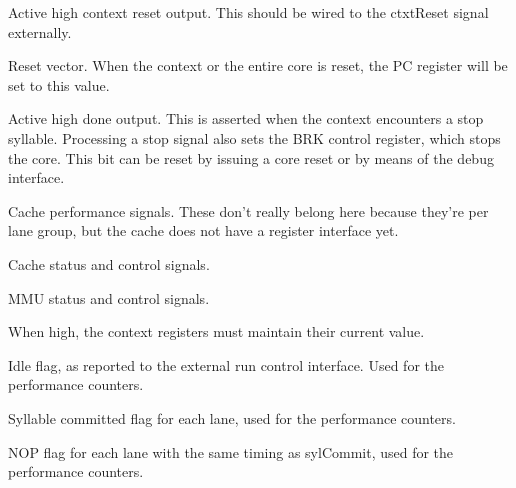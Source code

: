 
\contextInterface{}

\ifaceSubGroup{}
Active high context reset output. This should be wired to the ctxtReset signal
externally.
    
\ifaceSubGroup{}
Reset vector. When the context or the entire core is reset, the PC register will 
be set to this value.
    
\ifaceSubGroup{}
Active high done output. This is asserted when the context encounters a stop 
syllable. Processing a stop signal also sets the BRK control register, which 
stops the core. This bit can be reset by issuing a core reset or by means of the 
debug interface.

\ifaceSubGroup{}
Cache performance signals. These don't really belong here because they're per
lane group, but the cache does not have a register interface yet.

\ifaceSubGroup{}
Cache status and control signals.

\ifaceSubGroup{}
MMU status and control signals.

\ifaceSubGroup{}
When high, the context registers must maintain their current value.

\ifaceSubGroup{}
Idle flag, as reported to the external run control interface. Used for the 
performance counters.

\ifaceSubGroup{}
Syllable committed flag for each lane, used for the performance counters.
    
\ifaceSubGroup{}
NOP flag for each lane with the same timing as sylCommit, used for the 
performance counters.

